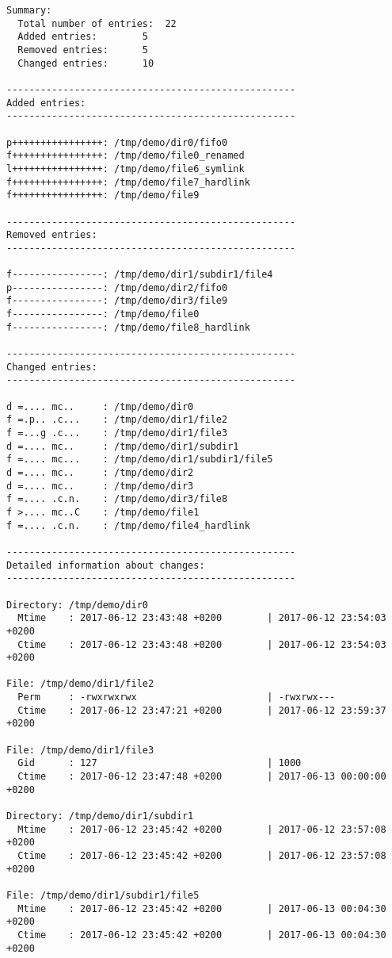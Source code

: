 \documentclass[thesis]{subfiles}
\begin{document}
\begin{appendices}
\begin{lstlisting}
Summary:
  Total number of entries:	22
  Added entries:		5
  Removed entries:		5
  Changed entries:		10

---------------------------------------------------
Added entries:
---------------------------------------------------

p++++++++++++++++: /tmp/demo/dir0/fifo0
f++++++++++++++++: /tmp/demo/file0_renamed
l++++++++++++++++: /tmp/demo/file6_symlink
f++++++++++++++++: /tmp/demo/file7_hardlink
f++++++++++++++++: /tmp/demo/file9

---------------------------------------------------
Removed entries:
---------------------------------------------------

f----------------: /tmp/demo/dir1/subdir1/file4
p----------------: /tmp/demo/dir2/fifo0
f----------------: /tmp/demo/dir3/file9
f----------------: /tmp/demo/file0
f----------------: /tmp/demo/file8_hardlink

---------------------------------------------------
Changed entries:
---------------------------------------------------

d =.... mc..     : /tmp/demo/dir0
f =.p.. .c...    : /tmp/demo/dir1/file2
f =...g .c...    : /tmp/demo/dir1/file3
d =.... mc..     : /tmp/demo/dir1/subdir1
f =.... mc...    : /tmp/demo/dir1/subdir1/file5
d =.... mc..     : /tmp/demo/dir2
d =.... mc..     : /tmp/demo/dir3
f =.... .c.n.    : /tmp/demo/dir3/file8
f >.... mc..C    : /tmp/demo/file1
f =.... .c.n.    : /tmp/demo/file4_hardlink

---------------------------------------------------
Detailed information about changes:
---------------------------------------------------

Directory: /tmp/demo/dir0
  Mtime    : 2017-06-12 23:43:48 +0200        | 2017-06-12 23:54:03 +0200
  Ctime    : 2017-06-12 23:43:48 +0200        | 2017-06-12 23:54:03 +0200

File: /tmp/demo/dir1/file2
  Perm     : -rwxrwxrwx                       | -rwxrwx---
  Ctime    : 2017-06-12 23:47:21 +0200        | 2017-06-12 23:59:37 +0200

File: /tmp/demo/dir1/file3
  Gid      : 127                              | 1000
  Ctime    : 2017-06-12 23:47:48 +0200        | 2017-06-13 00:00:00 +0200

Directory: /tmp/demo/dir1/subdir1
  Mtime    : 2017-06-12 23:45:42 +0200        | 2017-06-12 23:57:08 +0200
  Ctime    : 2017-06-12 23:45:42 +0200        | 2017-06-12 23:57:08 +0200

File: /tmp/demo/dir1/subdir1/file5
  Mtime    : 2017-06-12 23:45:42 +0200        | 2017-06-13 00:04:30 +0200
  Ctime    : 2017-06-12 23:45:42 +0200        | 2017-06-13 00:04:30 +0200


\end{lstlisting}
\end{appendices}
\end{document}
